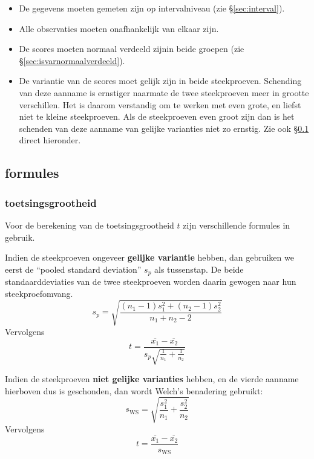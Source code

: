 \documentclass[
]{book}
\begin{document}
\begin{itemize}
\item
  De gegevens moeten gemeten zijn op intervalniveau (zie
  §\ref{sec:interval}).
\item
  Alle observaties moeten onafhankelijk van elkaar zijn.
\item
  De scores moeten normaal verdeeld zijnin beide groepen (zie
  §\ref{sec:isvarnormaalverdeeld}).
\item
  De variantie van de scores moet gelijk zijn in beide steekproeven.
  Schending van deze aanname is ernstiger naarmate de twee
  steekproeven meer in grootte verschillen. Het is daarom verstandig
  om te werken met even grote, en liefst niet te kleine steekproeven.
  Als de steekproeven even groot zijn dan is het schenden van deze
  aanname van gelijke varianties niet zo ernstig. Zie ook
  §\ref{sec:ttoets-formules} direct hieronder.
\end{itemize}

\subsection{formules}\label{sec:ttoets-formules}

\subsubsection{toetsingsgrootheid}\label{toetsingsgrootheid}

Voor de berekening van de toetsingsgrootheid \(t\) zijn verschillende
formules in gebruik.

Indien de steekproeven ongeveer \textbf{gelijke variantie} hebben, dan
gebruiken we eerst de ``pooled standard deviation'' \(s_p\) als tussenstap.
De beide standaarddeviaties van de twee steekproeven worden daarin
gewogen naar hun steekproefomvang.
\begin{equation}
    s_p = \sqrt{ \frac{(n_1-1) s^2_1 + (n_2-1) s^2_2} {n_1+n_2-2} }
    \label{eq:sd-pooled}
\end{equation}
Vervolgens
\begin{equation}
  \label{eq:t-homoskedastic}
  t = \frac{ \overline{x_1}-\overline{x_2} } { s_p \sqrt{\frac{1}{n_1}+\frac{1}{n_2}} }
\end{equation}

Indien de steekproeven \textbf{niet gelijke varianties} hebben, en de vierde
aanname hierboven dus is geschonden, dan wordt Welch's benadering
gebruikt:
\begin{equation}
  \label{eq:sd-WS}
  s_{\textrm{WS}} = \sqrt{\frac{s^2_1}{n_1}+\frac{s^2_2}{n_2} }
\end{equation}
Vervolgens
\begin{equation}
  \label{eq:t-WS}
  t = \frac{ \overline{x_1}-\overline{x_2} } { s_{\textrm{WS}} }
\end{equation}
\end{document}
